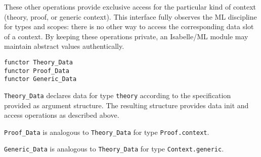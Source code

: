 \begin{isabellebody}
\begin{isamarkuptext}
  \noindent These other operations provide exclusive access for the
  particular kind of context (theory, proof, or generic context).
  This interface fully observes the ML discipline for types and
  scopes: there is no other way to access the corresponding data slot
  of a context.  By keeping these operations private, an Isabelle/ML
  module may maintain abstract values authentically.%
\end{isamarkuptext}%
\isamarkuptrue%
%
\isadelimmlref
%
\endisadelimmlref
%
\isatagmlref
%
\begin{isamarkuptext}%
\begin{mldecls}
  \verb|functor Theory_Data| \\
  \verb|functor Proof_Data| \\
  \verb|functor Generic_Data| \\
  \end{mldecls}

  \begin{description}

  \item \verb|Theory_Data| declares data for
  type \verb|theory| according to the specification provided as
  argument structure.  The resulting structure provides data init and
  access operations as described above.

  \item \verb|Proof_Data| is analogous to
  \verb|Theory_Data| for type \verb|Proof.context|.

  \item \verb|Generic_Data| is analogous to
  \verb|Theory_Data| for type \verb|Context.generic|.


\end{description}
\end{isamarkuptext}
\end{isabellebody}
